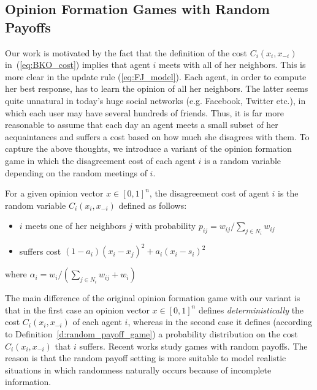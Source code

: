 \subsection{Opinion Formation Games with Random Payoffs}
Our work is motivated by the fact that the definition of the cost $C_i(x_i,x_{-i})$
in~(\ref{eq:BKO_cost}) implies that agent $i$ meets with all of
her neighbors. This is more
clear in the update rule (\ref{eq:FJ_model}). Each agent, in order to
compute her best response, has to learn the opinion of all her neighbors.
The latter seems quite unnatural in today's huge social networks
(e.g. Facebook, Twitter etc.), in which each user may have
several hundreds of friends. Thus, it is far more reasonable to assume
that each day an agent meets a small subset of her acquaintances and
suffers a cost based on how much she disagrees with them. To capture the above thoughts,
we introduce a variant of the opinion formation game in which the
disagreement cost of each agent $i$ is a random variable depending
on the random meetings of $i$.
%
\begin{definition}\label{d:random_payoff_game}
  For a given opinion vector $x \in [0,1]^n$, the disagreement cost of agent $i$
  is the random variable $C_i(x_i,x_{-i})$ defined as follows:
  \begin{itemize}
    \item $i$ meets one of her neighbors $j$ with probability
      $p_{ij}= w_{ij}/\sum_{j\in N_i}w_{ij}$
    \item suffers cost $(1-a_i)(x_i-x_j)^2 + a_i(x_i-s_i)^2$
  \end{itemize}
  where $\alpha_i = w_i/(\sum_{j\in N_i}w_{ij}+w_i)$
\end{definition}
%
The main difference of the original opinion formation game with our variant is that
in the first case an opinion vector $x\in [0,1]^n$ defines \emph{deterministically}
the cost $C_i(x_i,x_{-i})$ of each agent $i$, whereas in the second
case it defines (according to Definition~\ref{d:random_payoff_game})
a probability distribution on the cost $C_i(x_i,x_{-i})$ that $i$ suffers.
Recent works \cite{ZLZ17,CLL16} study games
with random payoffs. The reason is that the random payoff setting
is more suitable to model realistic situations in which
randomness naturally occurs because of incomplete information.

